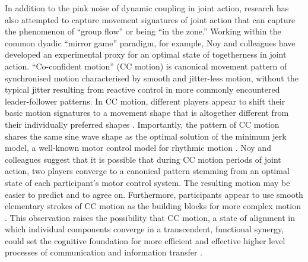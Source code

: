 \begin{CJK}{UTF8}{gbsn}
In addition to the pink noise of dynamic coupling in joint action, research has also attempted to capture movement signatures of joint action that can capture the phenomenon of ``group flow'' \citep{Sawyer2006} or being ``in the zone.''  Working within the common dyadic ``mirror game'' paradigm, for example, Noy and colleagues \textcite{Noy2011,Noy2015,Hart2014} have developed an experimental proxy for an optimal state of togetherness in joint action.  ``Co-confident motion'' (CC motion) is canonical movement pattern of synchronised motion characterised by smooth and jitter-less motion, without the typical jitter resulting from reactive control in more commonly encountered leader-follower patterns.  In CC motion, different players appear to shift their basic motion signatures to a movement shape that is altogether different from their individually preferred shapes \citep{Hart2014}. Importantly, the pattern of CC motion shares the same sine wave shape as the optimal solution of the minimum jerk model, a well-known motor control model for rhythmic motion \citep{Hogan2007}. Noy and colleagues suggest that it is possible that during CC motion periods of joint action, two players converge to a canonical pattern stemming from an optimal state of each participant’s motor control system.  The resulting motion may be easier to predict and to agree on. Furthermore, participants appear to use smooth elementary strokes of CC motion as the building blocks for more complex motion \citep{Noy2017}.  This observation raises the possibility that CC motion, a state of alignment in which individual components converge in a transcendent, functional synergy, could set the cognitive foundation for more efficient and effective higher level processes of communication and information transfer \citep[15]{Lerique2016}.



\end{CJK}
